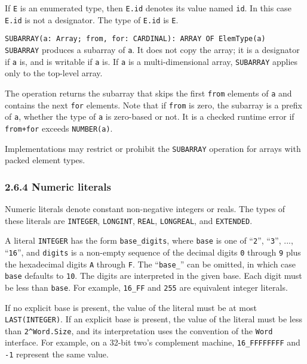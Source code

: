 \documentclass[10pt]{article}
\begin{document}
\begin{description}
  If \verb|E| is an enumerated type, then \verb|E.id| denotes its value named
  \verb|id|.  In this case \verb|E.id| is not a designator.  The type of
  \verb|E.id| is \verb|E|.
\item \verb|SUBARRAY(a: Array; from, for: CARDINAL): ARRAY OF ElemType(a)| \\
  \verb|SUBARRAY| produces a subarray of \verb|a|.  It does not copy the
  array; it is a designator if \verb|a| is, and is writable if \verb|a| is.
  If \verb|a| is a multi-dimensional array, \verb|SUBARRAY| applies only to
  the top-level array.

  The operation returns the subarray that skips the first \verb|from| elements
  of \verb|a| and contains the next \verb|for| elements.  Note that if
  \verb|from| is zero, the subarray is a prefix of \verb|a|, whether the type
  of \verb|a| is zero-based or not.  It is a checked runtime error if
  \verb|from+for| exceeds \verb|NUMBER(a)|.

  Implementations may restrict or prohibit the \verb|SUBARRAY| operation for
  arrays with packed element types.
\end{description}

\subsubsection*{2.6.4 Numeric literals}

Numeric literals denote constant non-negative integers or reals.  The types of
these literals are \verb|INTEGER|, \verb|LONGINT|, \verb|REAL|,
\verb|LONGREAL|, and \verb|EXTENDED|.

A literal \verb|INTEGER| has the form \verb|base_digits|, where \verb|base| is
one of ``\verb|2|'', ``\verb|3|'', ..., ``\verb|16|'', and \verb|digits| is a
non-empty sequence of the decimal digits \verb|0| through \verb|9| plus the
hexadecimal digits \verb|A| through \verb|F|.  The ``\verb|base_|'' can be
omitted, in which case \verb|base| defaults to \verb|10|.  The digits are
interpreted in the given base.  Each digit must be less than \verb|base|.  For
example, \verb|16_FF| and \verb|255| are equivalent integer literals.

If no explicit base is present, the value of the literal must be at most
\verb|LAST(INTEGER)|.  If an explicit base is present, the value of the
literal must be less than \verb|2^Word.Size|, and its interpretation uses the
convention of the \verb|Word| interface.  For example, on a 32-bit two's
complement machine, \verb|16_FFFFFFFF| and \verb|-1| represent the same value.
\end{document}

